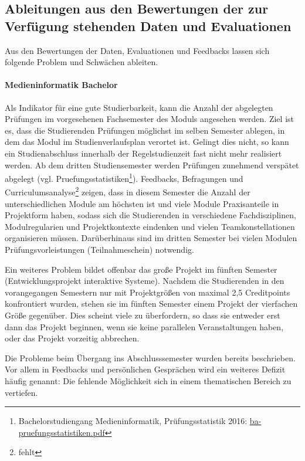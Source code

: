 \subsection{Ableitungen aus den Bewertungen der zur Verfügung
stehenden Daten und
Evaluationen}\label{ableitungen-aus-den-bewertungen-der-zur-verfuxfcgung-stehenden-daten-und-evaluationen}

Aus den Bewertungen der Daten, Evaluationen und Feedbacks lassen sich
folgende Problem und Schwächen ableiten.

\paragraph{Medieninformatik Bachelor}\label{medieninformatik-bachelor}

Als Indikator für eine gute Studierbarkeit, kann die Anzahl der
abgelegten Prüfungen im vorgesehenen Fachsemester des Moduls angesehen
werden. Ziel ist es, dass die Studierenden Prüfungen möglichst im selben
Semester ablegen, in dem das Modul im Studienverlaufsplan verortet ist.
Gelingt dies nicht, so kann ein Studienabschluss innerhalb der
Regelstudienzeit fast nicht mehr realisiert werden. Ab dem dritten
Studiensemester werden Prüfungen zunehmend verspätet abgelegt (vgl.
Pruefungsstatistiken\footnote{Bachelorstudiengang Medieninformatik,
  Prüfungsstatistik 2016:
  \href{https://th-koeln.github.io/mi-2017/anhaenge/ba-pruefungsstatistiken.pdf}{ba-pruefungsstatistiken.pdf}}).
Feedbacks, Befragungen und Curriculumsanalyse\footnote{fehlt} zeigen,
dass in diesem Semester die Anzahl der unterschiedlichen Module am
höchsten ist und viele Module Praxisanteile in Projektform haben, sodass
sich die Studierenden in verschiedene Fachdisziplinen, Modulregularien
und Projektkontexte eindenken und vielen Teamkonstellationen
organisieren müssen. Darüberhinaus sind im dritten Semester bei vielen
Modulen Prüfungsvorleistungen (Teilnahmeschein) notwendig.

Ein weiteres Problem bildet offenbar das große Projekt im fünften
Semester (Entwicklungsprojekt interaktive Systeme). Nachdem die
Studierenden in den vorangegangen Semestern nur mit Projektgrößen von
maximal 2,5 Creditpoints konfrontiert wurden, stehen sie im fünften
Semester einem Projekt der vierfachen Größe gegenüber. Dies scheint
viele zu überfordern, so dass sie entweder erst dann das Projekt
beginnen, wenn sie keine parallelen Veranstaltungen haben, oder das
Projekt vorzeitig abbrechen.

Die Probleme beim Übergang ins Abschlusssemester wurden bereits
beschrieben. Vor allem in Feedbacks und persönlichen Gesprächen wird ein
weiteres Defizit häufig genannt: Die fehlende Möglichkeit sich in einem
thematischen Bereich zu vertiefen.

